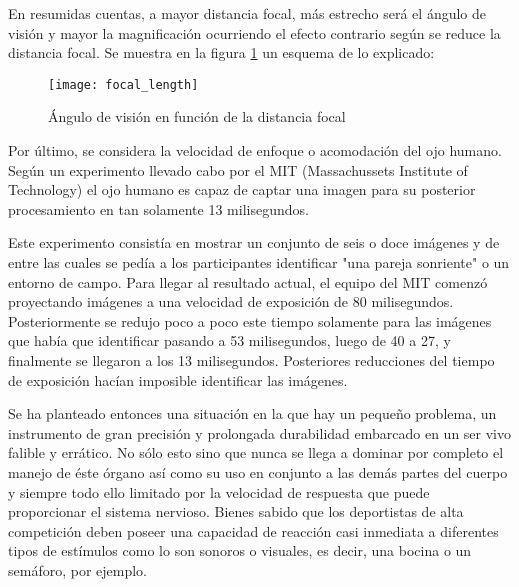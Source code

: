 En resumidas cuentas, a mayor distancia focal, más estrecho será el ángulo de visión y mayor la magnificación ocurriendo el efecto contrario según se reduce la distancia focal. Se muestra en la figura \ref{fig:focal_length} un esquema de lo explicado: 


\begin{figure}[!htb]
\centering
{}
  \texttt{[image: focal\_length]}
  \caption{Ángulo de visión en función de la distancia focal}\label{fig:focal_length}
\endminipage\hfill

\end{figure}



Por último, se considera la velocidad de enfoque o acomodación del ojo humano. Según un experimento llevado cabo por el MIT\cite{mit_experiment} (Massachussets Institute of Technology) el ojo humano es capaz de captar una imagen para su posterior procesamiento en tan solamente 13 milisegundos.

Este experimento consistía en  mostrar un conjunto de seis o doce imágenes y de entre las cuales se pedía a los participantes identificar "una pareja sonriente" o un entorno de campo. 
Para llegar al resultado actual, el equipo del MIT comenzó proyectando imágenes a una velocidad de exposición de 80 milisegundos. Posteriormente se redujo poco a poco este tiempo solamente para las imágenes que había que identificar pasando a 53 milisegundos, luego de 40 a 27, y finalmente se llegaron a los 13 milisegundos. Posteriores reducciones del tiempo de exposición hacían imposible identificar las imágenes.


Se ha planteado entonces una situación en la que hay un pequeño problema, un instrumento de gran precisión y prolongada durabilidad embarcado en un ser vivo falible y errático. No sólo esto sino que nunca se llega a dominar por completo el manejo de éste órgano así como su uso en conjunto a las demás partes del cuerpo y siempre todo ello limitado por la velocidad de respuesta que puede proporcionar el sistema nervioso.
Bienes sabido que los deportistas de alta competición deben poseer una capacidad de reacción casi inmediata a diferentes tipos de estímulos como lo son sonoros o visuales, es decir, una bocina o un semáforo, por ejemplo. 

